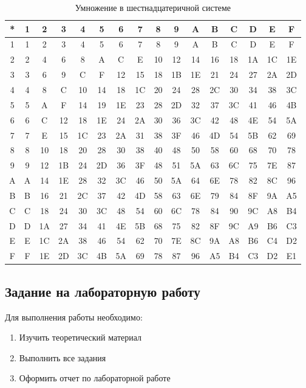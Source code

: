 \begin{table}[h!]
  \caption{Умножение в шестнадцатеричной системе}
  \begin{center}\label{tab:hexmul}
\begin{tabular}{|c|c|c|c|c|c|c|c|c|c|c|c|c|c|c|c|}
\hline
{*} & 1 & 2 & 3 & 4 & 5 & 6 & 7 & 8 & 9 & A & B & C & D & E & F\tabularnewline
\hline
1 & 1 & 2 & 3 & 4 & 5 & 6 & 7 & 8 & 9 & A & B & C & D & E & F\tabularnewline
\hline
2 & 2 & 4 & 6 & 8 & A & C & E & 10 & 12 & 14 & 16 & 18 & 1A & 1C & 1E\tabularnewline
\hline
3 & 3 & 6 & 9 & C & F & 12 & 15 & 18 & 1B & 1E & 21 & 24 & 27 & 2A & 2D\tabularnewline
\hline
4 & 4 & 8 & C & 10 & 14 & 18 & 1C & 20 & 24 & 28 & 2C & 30 & 34 & 38 & 3C\tabularnewline
\hline
5 & 5 & A & F & 14 & 19 & 1E & 23 & 28 & 2D & 32 & 37 & 3C & 41 & 46 & 4B\tabularnewline
\hline
6 & 6 & C & 12 & 18 & 1E & 24 & 2A & 30 & 36 & 3C & 42 & 48 & 4E & 54 & 5A\tabularnewline
\hline
7 & 7 & E & 15 & 1C & 23 & 2A & 31 & 38 & 3F & 46 & 4D & 54 & 5B & 62 & 69\tabularnewline
\hline
8 & 8 & 10 & 18 & 20 & 28 & 30 & 38 & 40 & 48 & 50 & 58 & 60 & 68 & 70 & 78\tabularnewline
\hline
9 & 9 & 12 & 1B & 24 & 2D & 36 & 3F & 48 & 51 & 5A & 63 & 6C & 75 & 7E & 87\tabularnewline
\hline
A & A & 14 & 1E & 28 & 32 & 3C & 46 & 50 & 5A & 64 & 6E & 78 & 82 & 8C & 96\tabularnewline
\hline
B & B & 16 & 21 & 2C & 37 & 42 & 4D & 58 & 63 & 6E & 79 & 84 & 8F & 9A & A5\tabularnewline
\hline
C & C & 18 & 24 & 30 & 3C & 48 & 54 & 60 & 6C & 78 & 84 & 90 & 9C & A8 & B4\tabularnewline
\hline
D & D & 1A & 27 & 34 & 41 & 4E & 5B & 68 & 75 & 82 & 8F & 9C & A9 & B6 & C3\tabularnewline
\hline
E & E & 1C & 2A & 38 & 46 & 54 & 62 & 70 & 7E & 8C & 9A & A8 & B6 & C4 & D2\tabularnewline
\hline
F & F & 1E & 2D & 3C & 4B & 5A & 69 & 78 & 87 & 96 & A5 & B4 & C3 & D2 & E1\tabularnewline
\hline
\end{tabular}
\end{center}
\end{table}


\newpage*
\subsection{Задание на лабораторную работу}

Для выполнения работы необходимо:
\begin{enumerate}
  \item Изучить теоретический материал
  \item Выполнить все задания
  \item Оформить отчет по лабораторной работе
\end{enumerate}

